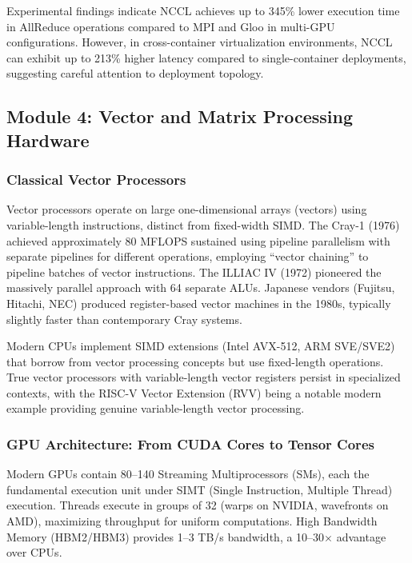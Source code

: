 \documentclass[11pt,letterpaper]{article}
\begin{document}
Experimental findings indicate NCCL achieves up to 345\% lower execution time in AllReduce operations compared to MPI and Gloo in multi-GPU configurations. However, in cross-container virtualization environments, NCCL can exhibit up to 213\% higher latency compared to single-container deployments, suggesting careful attention to deployment topology.

\subsection{Module 4: Vector and Matrix Processing Hardware}

\subsubsection{Classical Vector Processors}

Vector processors operate on large one-dimensional arrays (vectors) using variable-length instructions, distinct from fixed-width SIMD. The Cray-1 (1976) achieved approximately 80 MFLOPS sustained using pipeline parallelism with separate pipelines for different operations, employing ``vector chaining'' to pipeline batches of vector instructions. The ILLIAC IV (1972) pioneered the massively parallel approach with 64 separate ALUs. Japanese vendors (Fujitsu, Hitachi, NEC) produced register-based vector machines in the 1980s, typically slightly faster than contemporary Cray systems.

Modern CPUs implement SIMD extensions (Intel AVX-512, ARM SVE/SVE2) that borrow from vector processing concepts but use fixed-length operations. True vector processors with variable-length vector registers persist in specialized contexts, with the RISC-V Vector Extension (RVV) being a notable modern example providing genuine variable-length vector processing.

\subsubsection{GPU Architecture: From CUDA Cores to Tensor Cores}

Modern GPUs contain 80--140 Streaming Multiprocessors (SMs), each the fundamental execution unit under SIMT (Single Instruction, Multiple Thread) execution. Threads execute in groups of 32 (warps on NVIDIA, wavefronts on AMD), maximizing throughput for uniform computations. High Bandwidth Memory (HBM2/HBM3) provides 1--3 TB/s bandwidth, a 10--30$\times$ advantage over CPUs.
\end{document}
